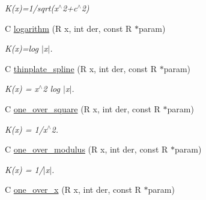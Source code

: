 \begin{DoxyCompactItemize}
\begin{DoxyCompactList}\small\item\em K(x)=1/sqrt(x$^\wedge$2+c$^\wedge$2) \end{DoxyCompactList}\item 
\hypertarget{group__applications__fastsum_ga23b3feae12a4bda6920953b9e2032dd1}{C \hyperlink{group__applications__fastsum_ga23b3feae12a4bda6920953b9e2032dd1}{logarithm} (R x, int der, const R $\ast$param)}\label{group__applications__fastsum_ga23b3feae12a4bda6920953b9e2032dd1}

\begin{DoxyCompactList}\small\item\em K(x)=log $\vert$x$\vert$. \end{DoxyCompactList}\item 
\hypertarget{group__applications__fastsum_gaa3f416b9cfdea11727bf8bad9eba48a7}{C \hyperlink{group__applications__fastsum_gaa3f416b9cfdea11727bf8bad9eba48a7}{thinplate\-\_\-spline} (R x, int der, const R $\ast$param)}\label{group__applications__fastsum_gaa3f416b9cfdea11727bf8bad9eba48a7}

\begin{DoxyCompactList}\small\item\em K(x) = x$^\wedge$2 log $\vert$x$\vert$. \end{DoxyCompactList}\item 
\hypertarget{group__applications__fastsum_ga64e65dd5dc045646a0cd4a9e875f0168}{C \hyperlink{group__applications__fastsum_ga64e65dd5dc045646a0cd4a9e875f0168}{one\-\_\-over\-\_\-square} (R x, int der, const R $\ast$param)}\label{group__applications__fastsum_ga64e65dd5dc045646a0cd4a9e875f0168}

\begin{DoxyCompactList}\small\item\em K(x) = 1/x$^\wedge$2. \end{DoxyCompactList}\item 
\hypertarget{group__applications__fastsum_ga79d3e4f4b39a35805102adfb6d2640a0}{C \hyperlink{group__applications__fastsum_ga79d3e4f4b39a35805102adfb6d2640a0}{one\-\_\-over\-\_\-modulus} (R x, int der, const R $\ast$param)}\label{group__applications__fastsum_ga79d3e4f4b39a35805102adfb6d2640a0}

\begin{DoxyCompactList}\small\item\em K(x) = 1/$\vert$x$\vert$. \end{DoxyCompactList}\item 
\hypertarget{group__applications__fastsum_gae9e287b708236b59d255239174e30dad}{C \hyperlink{group__applications__fastsum_gae9e287b708236b59d255239174e30dad}{one\-\_\-over\-\_\-x} (R x, int der, const R $\ast$param)}\label{group__applications__fastsum_gae9e287b708236b59d255239174e30dad}


\end{DoxyCompactItemize}
